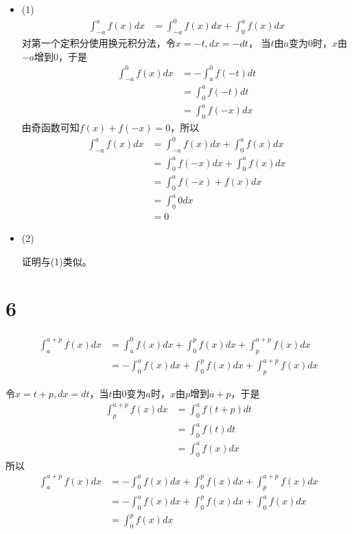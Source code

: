 \documentclass{article}
\begin{document}
\begin{itemize}
  \item (1)
        \begin{align*}
          \int_{-a}^{a} f(x) dx
           & = \int_{-a}^{0} f(x) dx + \int_{0}^{a} f(x) dx
        \end{align*}
        对第一个定积分使用换元积分法，令$x = -t, dx = -dt$，
        当$t$由$a$变为$0$时，$x$由$-a$增到$0$，于是
        \begin{align*}
          \int_{-a}^{0} f(x) dx & = - \int_{a}^{0} f(-t) dt \\
                                & = \int_{0}^{a} f(-t) dt   \\
                                & = \int_{0}^{a} f(-x) dx
        \end{align*}
        由奇函数可知$f(x) + f(-x) = 0$，所以
        \begin{align*}
          \int_{-a}^{a} f(x) dx
           & = \int_{-a}^{0} f(x) dx + \int_{0}^{a} f(x) dx \\
           & = \int_{0}^{a} f(-x) dx + \int_{0}^{a} f(x) dx \\
           & = \int_{0}^{a} f(-x) + f(x) dx                 \\
           & = \int_{0}^{a} 0 dx                            \\
           & = 0
        \end{align*}

  \item (2)

        证明与(1)类似。
\end{itemize}

\section*{6}
\begin{align*}
  \int_{a}^{a+p} f(x) dx
   & = \int_{a}^{0} f(x) dx + \int_{0}^{p} f(x) dx + \int_{p}^{a+p} f(x) dx   \\
   & = - \int_{0}^{a} f(x) dx + \int_{0}^{p} f(x) dx + \int_{p}^{a+p} f(x) dx
\end{align*}

令$x = t + p, dx = dt$，当$t$由$0$变为$a$时，$x$由$p$增到$a + p$，于是
\begin{align*}
  \int_{p}^{a+p} f(x) dx
   & = \int_{0}^{a} f(t + p) dt \\
   & = \int_{0}^{a} f(t) dt     \\
   & = \int_{0}^{a} f(x) dx
\end{align*}
所以
\begin{align*}
  \int_{a}^{a+p} f(x) dx
   & = - \int_{0}^{a} f(x) dx + \int_{0}^{p} f(x) dx + \int_{p}^{a+p} f(x) dx \\
   & = - \int_{0}^{a} f(x) dx + \int_{0}^{p} f(x) dx + \int_{0}^{a} f(x) dx   \\
   & = \int_{0}^{p} f(x) dx
\end{align*}
\end{document}
